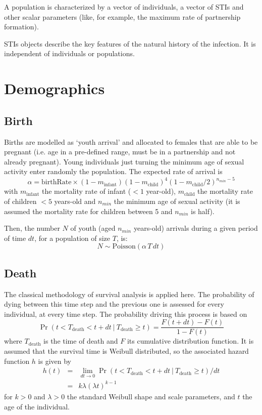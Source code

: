 \documentclass[11pt, onecolumn]{article}
\begin{document}
A population is characterized by a vector of individuals, a vector of STIs and other scalar parameters (like, for example, the maximum rate of partnership formation).

STIs objects describe the key features of the natural history of the infection. It is independent of individuals or populations.




\section{Demographics}

\subsection{Birth}

Births are modelled as `youth arrival' and allocated to females that are able to be pregnant (i.e. age in a pre-defined range, must be in a partnership and not already pregnant). Young individuals just turning the minimum age of sexual activity enter randomly the population. The expected rate of arrival is 
$$ \alpha = \mathrm{birthRate}\times(1-m_\mathrm{infant})(1-m_{\mathrm{child}})^4 (1-m_{\mathrm{child}}/2)^{n_{min}-5} $$
with $m_\mathrm{infant}$ the mortality rate of infant ($<1$ year-old), $m_\mathrm{child}$ the mortality rate of children $<5$ years-old and $n_{min}$ the minimum age of sexual activity (it is assumed the mortality rate for children between 5 and $n_{min}$ is half).

Then, the number $N$ of youth (aged $n_{min}$ years-old) arrivals during a given period of time $dt$, for a population of size $T$, is:
$$ N \sim \mathrm{Poisson} ( \alpha \, T \,dt)$$


\subsection{Death}

The classical methodology of survival analysis is applied here. The probability of dying between this time step and the previous one is assessed for every individual, at every time step. The probability driving this process is based on 
$$\Pr(t<T_{\mathrm{death}}<t+dt \ | \ T_{\mathrm{death}}\geq t) = \frac{F(t+dt)-F(t)}{1-F(t)}$$
where $T_{\mathrm{death}}$ is the time of death and $F$ its cumulative distribution function. It is assumed that the survival time is Weibull distributed, so the associated hazard function $h$  is given by
\begin{eqnarray}
h(t) &=& \lim_{dt\to 0}\Pr(t<T_{\mathrm{death}}<t+dt \ | \ T_{\mathrm{death}}\geq t)/dt \\
 & =& k\lambda(\lambda t)^{k-1}
\end{eqnarray}
for $k>0$ and $\lambda>0$ the standard Weibull shape and scale parameters, and $t$ the age of the individual. 
\end{document}
